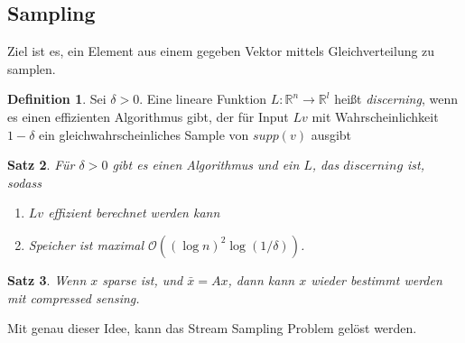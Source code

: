 \documentclass[a4paper, 12pt]{article}
\theoremstyle{plain}
\newtheorem{theorem}{Satz}[subsection] %
\theoremstyle{definition}
\newtheorem{definition}[theorem]{Definition} %
\theoremstyle{lemma}
\theoremstyle{remark}
\theoremstyle{corollary}
\theoremstyle{example}
\begin{document}
	\subsection{Sampling}
	Ziel ist es, ein Element aus einem gegeben Vektor mittels Gleichverteilung zu samplen.
	\begin{definition}
		Sei $\delta>0$. Eine lineare Funktion $L:\mathbb{R}^n \to \mathbb{R}^l$ heißt \textit{discerning}, wenn es einen effizienten Algorithmus gibt, der für Input $Lv$ mit Wahrscheinlichkeit $1-\delta$ ein gleichwahrscheinliches Sample von $supp(v)$ ausgibt 
	\end{definition}
	\begin{theorem}
		Für $\delta>0$ gibt es einen Algorithmus und ein $L$, das $\textit{discerning}$ ist, sodass \begin{enumerate}
			\item $Lv$ effizient berechnet werden kann
			\item Speicher ist maximal $\mathcal{O}((\log n)^2\log (1/\delta))$.
		\end{enumerate}
	\end{theorem}
	\begin{theorem}
		Wenn $x$ \textit{sparse} ist, und $\bar{x} = Ax$, dann kann $x$ wieder bestimmt werden mit \textit{compressed sensing}.
	\end{theorem}
	Mit genau dieser Idee, kann das Stream Sampling Problem gelöst werden.
\end{document}

